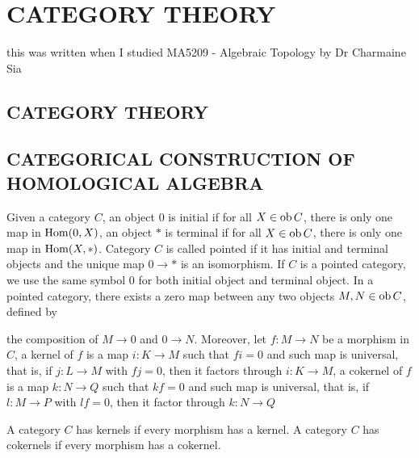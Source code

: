 \chapter{CATEGORY THEORY}

this was written when I studied MA5209 - Algebraic Topology by Dr Charmaine Sia

\section{CATEGORY THEORY}

\section{CATEGORICAL CONSTRUCTION OF HOMOLOGICAL ALGEBRA }

\begin{definition}
	Given a category $C$, an object $0$ is initial if for all $X \in \operatorname{ob} C$, there is only one map in $\operatorname{Hom}(0, X)$, an object $*$ is terminal if for all $X \in \operatorname{ob} C$, there is only one map in $\operatorname{Hom}(X, *)$. Category $C$ is called pointed if it has initial and terminal objects and the unique map $0 \to *$ is an isomorphism. If $C$ is a pointed category, we use the same symbol $0$ for both initial object and terminal object. In a pointed category, there exists a zero map between any two objects $M, N \in \operatorname{ob} C$, defined by
	\begin{center}
	\end{center}
	the composition of $M \to 0$ and $0 \to N$. Moreover, let $f: M \to N$ be a morphism in $C$, a kernel of $f$ is a map $i: K \to M$ such that $f i = 0$ and such map is universal, that is, if $j: L \to M$ with $f j = 0$, then it factors through $i: K \to M$, a cokernel of $f$ is a map $k: N \to Q$ such that $kf = 0$  and such map is universal, that is, if $l: M \to P$ with $lf = 0$, then it factor through $k: N \to Q$
	\begin{center}
	\end{center}
	A category $C$ has kernels if every morphism has a kernel. A category $C$ has cokernels if every morphism has a cokernel.
\end{definition}

